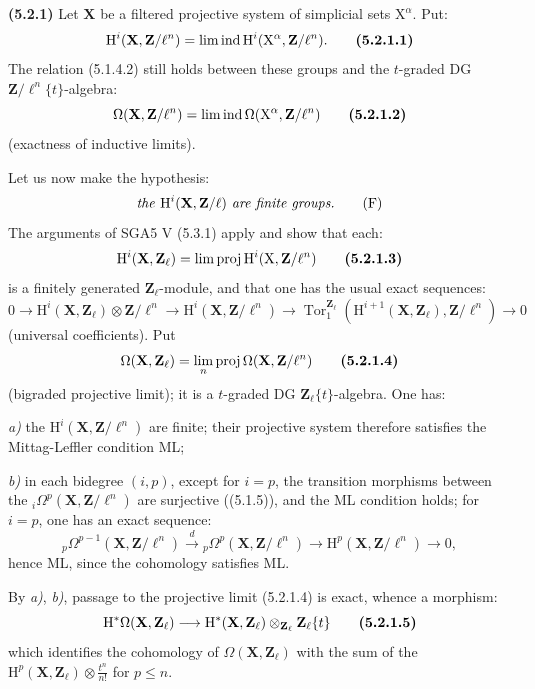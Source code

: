 \documentclass[11pt,leqno]{article}
\begin{document}
\textbf{(5.2.1)} Let \(\mathbf{X}\) be a filtered projective system of simplicial sets \(\mathrm{X}^{\alpha}\). Put:
\[
\mathrm{H}^i(\mathbf{X},\mathbf{Z}/\ell^n)
=\mathop{\mathrm{lim}\,\mathrm{ind}}\mathrm{H}^i(\mathrm{X}^{\alpha},\mathbf{Z}/\ell^n).
\tag*{\textbf{(5.2.1.1)}}
\]
The relation (5.1.4.2) still holds between these groups and the \(t\)-graded DG \(\mathbf{Z}/\ell^n\{t\}\)-algebra:
\[
\Omega(\mathbf{X},\mathbf{Z}/\ell^n)
=\mathop{\mathrm{lim}\,\mathrm{ind}}\Omega(\mathrm{X}^{\alpha},\mathbf{Z}/\ell^n)
\tag*{\textbf{(5.2.1.2)}}
\]
(exactness of inductive limits).

Let us now make the hypothesis:
\[
\text{\textit{the }}\mathrm{H}^i(\mathbf{X},\mathbf{Z}/\ell)
\text{\textit{ are finite groups.}}
\tag*{(F)}
\]
The arguments of SGA5 V (5.3.1) apply and show that each:
\[
\mathrm{H}^i(\mathbf{X},\mathbf{Z}_{\ell})
=\mathop{\mathrm{lim}\,\mathrm{proj}}\mathrm{H}^i(\mathrm{X},\mathbf{Z}/\ell^n)
\tag*{\textbf{(5.2.1.3)}}
\]
is a finitely generated \(\mathbf{Z}_{\ell}\)-module, and that one has the usual exact sequences:
\[
0\longrightarrow
\mathrm{H}^i(\mathbf{X},\mathbf{Z}_{\ell})\otimes\mathbf{Z}/\ell^n
\longrightarrow
\mathrm{H}^i(\mathbf{X},\mathbf{Z}/\ell^n)
\longrightarrow
\operatorname{Tor}_{1}^{\mathbf{Z}_{\ell}}
(\mathrm{H}^{i+1}(\mathbf{X},\mathbf{Z}_{\ell}),\mathbf{Z}/\ell^n)
\longrightarrow0
\]
(universal coefficients). Put
\[
\Omega(\mathbf{X},\mathbf{Z}_{\ell})
=\lim_{n}\mathrm{proj}\,\Omega(\mathbf{X},\mathbf{Z}/\ell^n)
\tag*{\textbf{(5.2.1.4)}}
\]
(bigraded projective limit); it is a \(t\)-graded DG \(\mathbf{Z}_{\ell}\{t\}\)-algebra. One has:

\textit{a)} the \(\mathrm{H}^i(\mathbf{X},\mathbf{Z}/\ell^n)\) are finite; their projective system therefore satisfies the Mittag-Leffler condition ML;

\textit{b)} in each bidegree \((i,p)\), except for \(i=p\), the transition morphisms between the \({}_i\Omega^p(\mathbf{X},\mathbf{Z}/\ell^n)\) are surjective ((5.1.5)), and the ML condition holds; for \(i=p\), one has an exact sequence:
\[
{}_p\Omega^{p-1}(\mathbf{X},\mathbf{Z}/\ell^n)
\xrightarrow{d}
{}_p\Omega^p(\mathbf{X},\mathbf{Z}/\ell^n)
\longrightarrow
\mathrm{H}^p(\mathbf{X},\mathbf{Z}/\ell^n)
\longrightarrow0,
\]
hence ML, since the cohomology satisfies ML.

By \textit{a)}, \textit{b)}, passage to the projective limit (5.2.1.4) is exact, whence a morphism:
\[
\mathrm{H}^*\Omega(\mathbf{X},\mathbf{Z}_{\ell})
\longrightarrow
\mathrm{H}^*(\mathbf{X},\mathbf{Z}_{\ell})
\otimes_{\mathbf{Z}_{\ell}}\mathbf{Z}_{\ell}\{t\}
\tag*{\textbf{(5.2.1.5)}}
\]
which identifies the cohomology of \(\Omega(\mathbf{X},\mathbf{Z}_{\ell})\) with the sum of the \(\mathrm{H}^p(\mathbf{X},\mathbf{Z}_{\ell})\otimes\frac{t^n}{n!}\) for \(p\leq n\).
\end{document}
